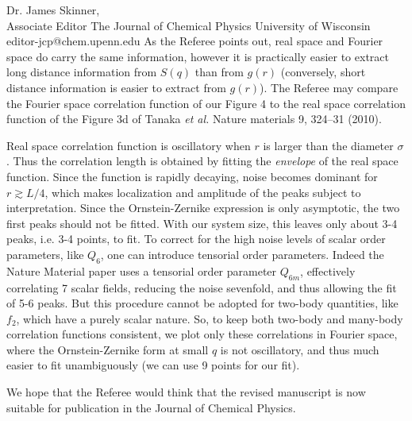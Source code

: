 \documentclass[a4paper, rebuttal, parskip=true, firsthead=false, fromemail=false, foldmarks=false]{scrlttr2}
\begin{document}
\begin{letter}{Dr. James Skinner,\\Associate Editor
The Journal of Chemical Physics
University of Wisconsin\\
editor-jcp@chem.upenn.edu }
As the Referee points out, real space and Fourier space do carry the same information, however it is practically easier to extract long distance information from $S(q)$ than from $g(r)$ (conversely, short distance information is easier to extract from $g(r)$). The Referee may compare the Fourier space correlation function of our Figure 4 to the real space correlation function of the Figure 3d of Tanaka \emph{et al.} Nature materials 9, 324–31 (2010).

Real space correlation function is oscillatory when $r$ is larger than the diameter $\sigma$. Thus the correlation length is obtained by fitting the \emph{envelope} of the real space function. Since the function is rapidly decaying, noise becomes dominant for $r\gtrsim L/4$, which makes localization and amplitude of the peaks subject to interpretation. Since the Ornstein-Zernike expression is only asymptotic, the two first peaks should not be fitted. With our system size, this leaves only about 3-4 peaks, i.e. 3-4 points, to fit. To correct for the high noise levels of scalar order parameters, like $Q_6$, one can introduce tensorial order parameters. Indeed the Nature Material paper uses a tensorial order parameter $Q_{6m}$, effectively correlating 7 scalar fields, reducing the noise sevenfold, and thus allowing the fit of 5-6 peaks. But this procedure cannot be adopted for two-body quantities, like $f_2$, which have a purely scalar nature. So, to keep both two-body and many-body
correlation functions consistent, we plot only these correlations in Fourier space, where
the Ornstein-Zernike form at small $q$ is not oscillatory, and thus much easier to fit unambiguously (we can use 9 points for our fit).




We hope that the Referee would think that the revised manuscript is now suitable for publication in the Journal of Chemical Physics.



\end{letter} 
\end{document}

